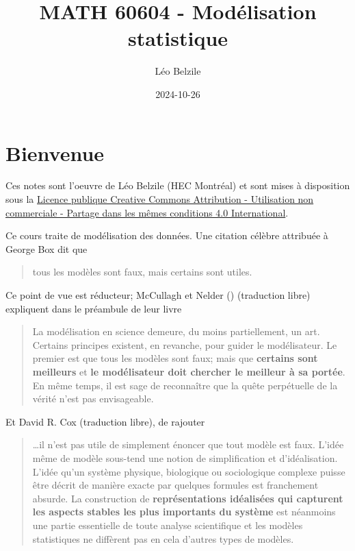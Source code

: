 \documentclass[
  11pt,
  letterpaper,
]{scrbook}
\title{MATH 60604 - Modélisation statistique}
\author{Léo Belzile}
\date{2024-10-26}
\renewcommand*\contentsname{Table des matières}
\newcommand\contentsname{Table des matières}
\theoremstyle{definition}
\theoremstyle{plain}
\theoremstyle{definition}
\theoremstyle{plain}
\theoremstyle{remark}
\begin{document}


\renewcommand*\contentsname{Table des matières}
{
\setcounter{tocdepth}{2}
\tableofcontents
}

\mainmatter
{}

\chapter*{Bienvenue}\label{bienvenue}


Ces notes sont l'oeuvre de Léo Belzile (HEC Montréal) et sont mises à
disposition sous la
\href{https://creativecommons.org/licenses/by-nc-sa/4.0/legalcode.fr}{Licence
publique Creative Commons Attribution - Utilisation non commerciale -
Partage dans les mêmes conditions 4.0 International}.

Ce cours traite de modélisation des données. Une citation célèbre
attribuée à George Box dit que

\begin{quote}
tous les modèles sont faux, mais certains sont utiles.
\end{quote}

Ce point de vue est réducteur; McCullagh et Nelder
() (traduction libre)
expliquent dans le préambule de leur livre

\begin{quote}
La modélisation en science demeure, du moins partiellement, un art.
Certains principes existent, en revanche, pour guider le modélisateur.
Le premier est que tous les modèles sont faux; mais que \textbf{certains
sont meilleurs} et \textbf{le modélisateur doit chercher le meilleur à
sa portée}. En même temps, il est sage de reconnaître que la quête
perpétuelle de la vérité n'est pas envisageable.
\end{quote}

Et David R. Cox (traduction libre), de rajouter

\begin{quote}
\ldots il n'est pas utile de simplement énoncer que tout modèle est
faux. L'idée même de modèle sous-tend une notion de simplification et
d'idéalisation. L'idée qu'un système physique, biologique ou
sociologique complexe puisse être décrit de manière exacte par quelques
formules est franchement absurde. La construction de
\textbf{représentations idéalisées qui capturent les aspects stables les
plus importants du système} est néanmoins une partie essentielle de
toute analyse scientifique et les modèles statistiques ne diffèrent pas
en cela d'autres types de modèles.
\end{quote}
\end{document}
